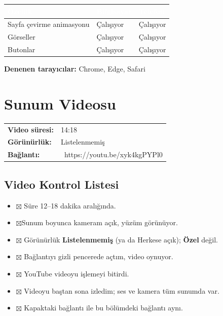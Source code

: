 \documentclass[12pt,a4paper]{article}
\begin{document}
\begin{center}
\begin{tabular}{@{}p{6cm}p{3.4cm}p{3.4cm}@{}}
\toprule
\rowcolor{ana}\textcolor{white}{\textbf{Özellik}} & \textcolor{white}{\textbf{Bilgisayar}} & \textcolor{white}{\textbf{Telefon}} \\
\midrule
\relax Sayfa çevirme animasyonu & Çalışıyor & Çalışıyor  \\
\relax Görseller & Çalışıyor  & Çalışıyor  \\
\relax Butonlar & Çalışıyor & Çalışıyor  \\
\bottomrule
\end{tabular}
\end{center}

\textbf{Denenen tarayıcılar:} Chrome, Edge, Safari 

\section{Sunum Videosu}
\begin{center}
\begin{tabular}{@{}ll@{}}
\textbf{Video süresi:} & 14:18 \quad  \\
\textbf{Görünürlük:} & Listelenmemiş  \\
\textbf{Bağlantı:} & \ https://youtu.be/xyk4kgPYPl0 \\
\end{tabular}
\end{center}

\subsection{Video Kontrol Listesi}

\begin{itemize}[label=]
  \item $\boxtimes$ Süre 12--18 dakika aralığında.
  \item $\boxtimes$Sunum boyunca kameram açık, yüzüm görünüyor.
  \item $\boxtimes$ Görünürlük \textbf{Listelenmemiş} (ya da Herkese açık); \textbf{Özel} değil.
  \item $\boxtimes$ Bağlantıyı gizli pencerede açtım, video oynuyor.
  \item $\boxtimes$ YouTube videoyu işlemeyi bitirdi.
  \item $\boxtimes$ Videoyu baştan sona izledim; ses ve kamera tüm sunumda var.
  \item $\boxtimes$ Kapaktaki bağlantı ile bu bölümdeki bağlantı aynı.
\end{itemize}
\end{document}

